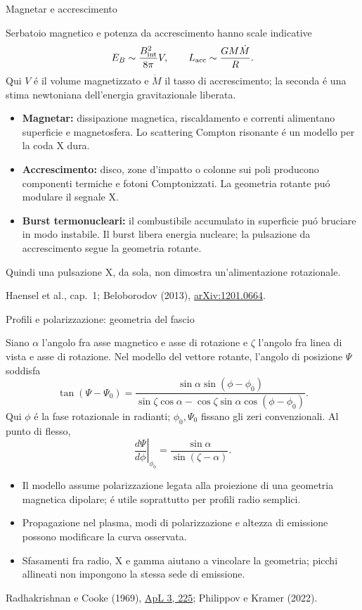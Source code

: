 \begin{frame}[t]{Magnetar e accrescimento}
\small\raggedright
Serbatoio magnetico e potenza da accrescimento hanno scale indicative
\[
E_B\sim\frac{B_{\rm int}^2}{8\pi}V,\qquad
L_{\rm acc}\sim\frac{GM\dot M}{R}.
\]
Qui $V$ \'e il volume magnetizzato e $\dot M$ il tasso di accrescimento;
la seconda \'e una stima newtoniana dell'energia gravitazionale liberata.
\begin{itemize}
\item \textbf{Magnetar:} dissipazione magnetica, riscaldamento e correnti
alimentano superficie e magnetosfera. Lo scattering Compton risonante
\'e un modello per la coda X dura.
\item \textbf{Accrescimento:} disco, zone d'impatto o colonne sui poli
producono componenti termiche e fotoni Comptonizzati.
La geometria rotante pu\'o modulare il segnale X.
\item \textbf{Burst termonucleari:} il combustibile accumulato in superficie
pu\'o bruciare in modo instabile. Il burst libera energia nucleare;
la pulsazione da accrescimento segue la geometria rotante.
\end{itemize}
Quindi una pulsazione X, da sola, non dimostra un'alimentazione rotazionale.
\par\smallskip
\footnotesize Haensel et al., cap.~1;
Beloborodov (2013), \href{https://arxiv.org/abs/1201.0664}{arXiv:1201.0664}.
\end{frame}

\begin{frame}[t]{Profili e polarizzazione: geometria del fascio}
\small\raggedright
Siano $\alpha$ l'angolo fra asse magnetico e asse di rotazione
e $\zeta$ l'angolo fra linea di vista e asse di rotazione.
Nel modello del vettore rotante, l'angolo di posizione $\Psi$ soddisfa
\[
\tan(\Psi-\Psi_0)=
\frac{\sin\alpha\sin(\phi-\phi_0)}
{\sin\zeta\cos\alpha-\cos\zeta\sin\alpha\cos(\phi-\phi_0)}.
\]
Qui $\phi$ \'e la fase rotazionale in radianti;
$\phi_0,\Psi_0$ fissano gli zeri convenzionali. Al punto di flesso,
\[
\left.\frac{d\Psi}{d\phi}\right|_{\phi_0}
=\frac{\sin\alpha}{\sin(\zeta-\alpha)}.
\]
\begin{itemize}
\item Il modello assume polarizzazione legata alla proiezione
di una geometria magnetica dipolare; \'e utile soprattutto per profili radio semplici.
\item Propagazione nel plasma, modi di polarizzazione e altezza di emissione
possono modificare la curva osservata.
\item Sfasamenti fra radio, X e gamma aiutano a vincolare la geometria;
picchi allineati non impongono la stessa sede di emissione.
\end{itemize}
\par\smallskip
\footnotesize Radhakrishnan e Cooke (1969),
\href{https://articles.adsabs.harvard.edu/pdf/1969ApL.....3..225R}{ApL 3, 225};
Philippov e Kramer (2022).
\end{frame}

